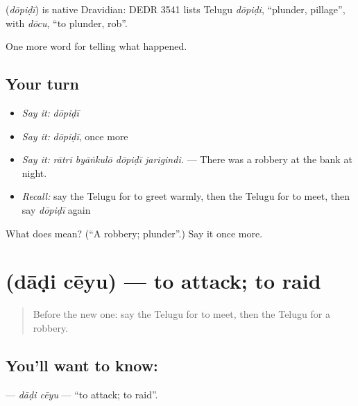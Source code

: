 \begin{cousinweb}
\textbf{} (\emph{dōpiḍī}) is native Dravidian: DEDR 3541 lists Telugu \emph{dōpiḍi}, \textquotedblleft{}plunder, pillage\textquotedblright{}, with \emph{dōcu}, \textquotedblleft{}to plunder, rob\textquotedblright{}.
\end{cousinweb}

\begin{grammarlens}[title={What you've built}]
One more word for telling what happened.
\end{grammarlens}

\subsection*{Your turn}
\begin{itemize}
\raggedright
  \item \emph{Say it:} \emph{dōpiḍī}
  \item \emph{Say it:} \emph{dōpiḍī}, once more
  \item \emph{Say it:} \emph{rātri byāṅkulō dōpiḍī jarigindi.} — There was a robbery at the bank at night.
  \item \emph{Recall:} say the Telugu for to greet warmly, then the Telugu for to meet, then say \emph{dōpiḍī} again
\end{itemize}

\begin{tcolorbox}[breakable,colback=teal!4,colframe=teal!35!black,title={Before you move on}]
What does  mean? (\textquotedblleft{}A robbery; plunder\textquotedblright{}.) Say it once more.
\end{tcolorbox}
\section[\texorpdfstring{\te{దాడి} \te{చేయు} (dāḍi cēyu)}{దాడి చేయు (dāḍi cēyu)}]{  (dāḍi cēyu) — to attack; to raid}

\label{lesson:TE-C348-dadi-ceyu}



\begin{quote}
Before the new one: say the Telugu for to meet, then the Telugu for a robbery.
\end{quote}

\subsection*{You'll want to know:  }
\textbf{ } — \emph{dāḍi cēyu} — \textquotedblleft{}to attack; to raid\textquotedblright{}.

